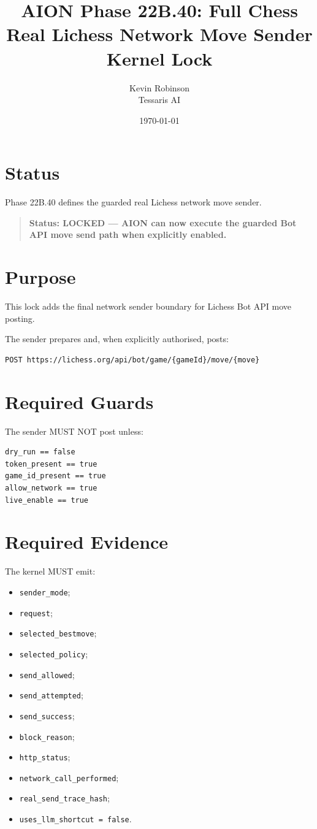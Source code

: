 \documentclass[11pt,a4paper]{article}
\title{\textbf{AION Phase 22B.40: Full Chess Real Lichess Network Move Sender Kernel Lock}}
\author{Kevin Robinson\\Tessaris AI}
\date{\today}
\begin{document}
\maketitle

\section{Status}

Phase 22B.40 defines the guarded real Lichess network move sender.

\begin{quote}
\textbf{Status: LOCKED --- AION can now execute the guarded Bot API move send path when explicitly enabled.}
\end{quote}

\section{Purpose}

This lock adds the final network sender boundary for Lichess Bot API move posting.

The sender prepares and, when explicitly authorised, posts:

\begin{verbatim}
POST https://lichess.org/api/bot/game/{gameId}/move/{move}
\end{verbatim}

\section{Required Guards}

The sender MUST NOT post unless:

\begin{verbatim}
dry_run == false
token_present == true
game_id_present == true
allow_network == true
live_enable == true
\end{verbatim}

\section{Required Evidence}

The kernel MUST emit:

\begin{itemize}
  \item \texttt{sender\_mode};
  \item \texttt{request};
  \item \texttt{selected\_bestmove};
  \item \texttt{selected\_policy};
  \item \texttt{send\_allowed};
  \item \texttt{send\_attempted};
  \item \texttt{send\_success};
  \item \texttt{block\_reason};
  \item \texttt{http\_status};
  \item \texttt{network\_call\_performed};
  \item \texttt{real\_send\_trace\_hash};
  \item \texttt{uses\_llm\_shortcut = false}.
\end{itemize}
\end{document}
